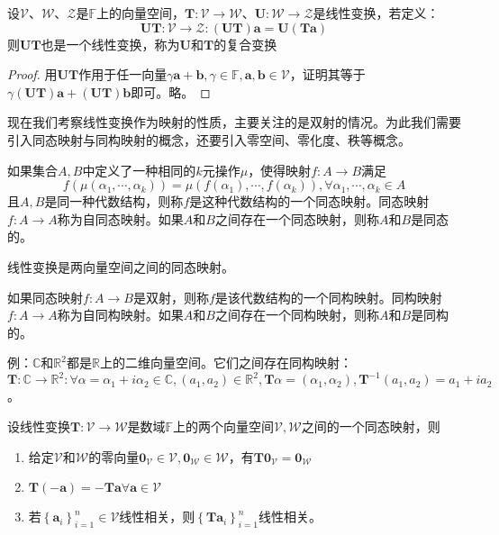 \documentclass[main.tex]{subfiles}
\begin{document}
\begin{theorem}
设$\mathcal{V}$、$\mathcal{W}$、$\mathcal{Z}$是$\mathbb{F}$上的向量空间，$\mathbf{T}:\mathcal{V}\rightarrow\mathcal{W}$、$\mathbf{U}:\mathcal{W}\rightarrow\mathcal{Z}$是线性变换，若定义：
\[\mathbf{UT}:\mathcal{V}\rightarrow\mathcal{Z}:\left(\mathbf{UT}\right)\mathbf{a}=\mathbf{U}\left(\mathbf{Ta}\right)\]
则$\mathbf{UT}$也是一个线性变换，称为$\mathbf{U}$和$\mathbf{T}$的复合变换
\label{theo:composed_transform}
\end{theorem}
\begin{proof}
用$\mathbf{UT}$作用于任一向量$\gamma\mathbf{a}+\mathbf{b},\gamma\in\mathbb{F},\mathbf{a},\mathbf{b}\in\mathcal{V}$，证明其等于$\gamma\left(\mathbf{UT}\right)\mathbf{a}+\left(\mathbf{UT}\right)\mathbf{b}$即可。略。
\end{proof}

现在我们考察线性变换作为映射的性质，主要关注的是双射的情况。为此我们需要引入同态映射与同构映射的概念，还要引入零空间、零化度、秩等概念。

\begin{definition}[同态映射]
如果集合$A,B$中定义了一种相同的$k$元操作$\mu$，使得映射$f:A\rightarrow B$满足
\[f\left(\mu\left(\alpha_1,\cdots,\alpha_k\right)\right)=\mu\left(f\left(\alpha_1\right),\cdots,f\left(\alpha_k\right)\right),\forall\alpha_1,\cdots,\alpha_k\in A\]
且$A,B$是同一种代数结构，则称$f$是这种代数结构的一个同态映射。同态映射$f:A\rightarrow A$称为自同态映射。如果$A$和$B$之间存在一个同态映射，则称$A$和$B$是同态的。
\end{definition}

线性变换是两向量空间之间的同态映射。

\begin{definition}[同构映射]
如果同态映射$f:A\rightarrow B$是双射，则称$f$是该代数结构的一个同构映射。同构映射$f:A\rightarrow A$称为自同构映射。如果$A$和$B$之间存在一个同构映射，则称$A$和$B$是同构的。
\end{definition}

例：$\mathbb{C}$和$\mathbb{R}^2$都是$\mathbb{R}$上的二维向量空间。它们之间存在同构映射：$\mathbf{T}:\mathbb{C}\rightarrow\mathbb{R}^2:\forall \alpha=\alpha_1+i\alpha_2\in\mathbb{C},\left(a_1,a_2\right)\in\mathbb{R}^2,\mathbf{T}\alpha=\left(\alpha_1,\alpha_2\right),\mathbf{T}^{-1}\left(a_1,a_2\right)=a_1+ia_2$。

\begin{theorem}
设线性变换$\mathbf{T}:\mathcal{V}\rightarrow\mathcal{W}$是数域$\mathbb{F}$上的两个向量空间$\mathcal{V},\mathcal{W}$之间的一个同态映射，则
\begin{enumerate}
    \item 给定$\mathcal{V}$和$\mathcal{W}$的零向量$\mathbf{0}_\mathcal{V}\in\mathcal{V},\mathbf{0}_\mathcal{W}\in\mathcal{W}$，有$\mathbf{T0}_\mathcal{V}=\mathbf{0}_\mathcal{W}$
    \item $\mathbf{T}\left(-\mathbf{a}\right)=-\mathbf{Ta}\forall\mathbf{a}\in\mathcal{V}$
    \item 若$\left\{\mathbf{a}_i\right\}_{i=1}^n\in\mathcal{V}$线性相关，则$\left\{\mathbf{Ta}_i\right\}_{i=1}^n$线性相关。
\end{enumerate}
\end{theorem}
\end{document}
